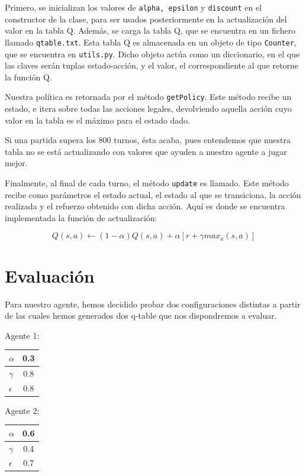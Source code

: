 \documentclass[12pt]{article}
\begin{document}
Primero, se inicializan los valores de \texttt{alpha, epsilon} y \texttt{discount} en el constructor de la clase, para ser usados posteriormente en la actualización del valor en la tabla Q. Además, se carga la tabla Q, que se encuentra en un fichero llamado \texttt{qtable.txt}. Esta tabla Q es almacenada en un objeto de tipo \texttt{Counter}, que se encuentra en \texttt{utils.py}. Dicho objeto actúa como un diccionario, en el que las claves serán tuplas estado-acción, y el valor, el correspondiente al que retorne la función Q.

Nuestra política es retornada por el método \texttt{getPolicy}. Este método recibe un estado, e itera sobre todas las acciones legales, devolviendo aquella acción cuyo valor en la tabla es el máximo para el estado dado.

Si una partida supera los 800 turnos, ésta acaba, pues entendemos que nuestra tabla no se está actualizando con valores que ayuden a nuestro agente a jugar mejor.

Finalmente, al final de cada turno, el método \texttt{update} es llamado. Este método recibe como parámetros el estado actual, el estado al que se transiciona, la acción realizada y el refuerzo obtenido con dicha acción. Aquí es donde se encuentra implementada la función de actualización:

\begin{equation*}
	Q(s,a)\gets(1-\alpha) Q(s,a)+\alpha [r+\gamma max_a (s,a)]
\end{equation*}

\section{Evaluación}
Para nuestro agente, hemos decidido probar dos configuraciones distintas a partir de las cuales hemos generados dos q-table que nos dispondremos a evaluar.

Agente 1:
\begin{tabular}{ l | c}
	\hline
	$\alpha$	& 0.3 \\ \hline
	$\gamma$		& 0.8 \\ \hline
	$\epsilon$	& 0.8 \\ 
	\hline
\end{tabular}

Agente 2:
\begin{tabular}{ l | c}
	\hline
	$\alpha$	& 0.6 \\ \hline
	$\gamma$		& 0.4 \\ \hline
	$\epsilon$	& 0.7 \\ 
	\hline
\end{tabular}
\end{document}
